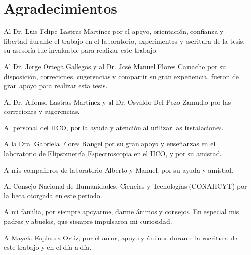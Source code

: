\chapter{Agradecimientos}
\label{chap:acknowledgments}

Al Dr. Luis Felipe Lastras Martínez por el apoyo, orientación, confianza y libertad durante el trabajo en el laboratorio, experimentos y escritura de la tesis, su asesoría fue invaluable para realizar este trabajo.

Al Dr. Jorge Ortega Gallegos y al Dr. José Manuel Flores Camacho por su disposición, correciones, sugerencias y compartir su gran experiencia, fueron de gran apoyo para realizar esta tesis.

Al Dr. Alfonso Lastras Martínez y al Dr. Osvaldo Del Pozo Zamudio por las correciones y sugerencias.

Al personal del IICO, por la ayuda y atención al utilizar las instalaciones.

A la Dra. Gabriela Flores Rangel por su gran apoyo y enseñanzas en el laboratorio de Elipsometría Espectroscopia en el IICO, y por su amistad. 

A mis compañeros de laboratorio Alberto y Manuel, por su ayuda y amistad.

Al Consejo Nacional de Humanidades, Ciencias y Tecnologías (CONAHCYT) por la beca otorgada en este periodo.

A mi familia, por siempre apoyarme, darme ánimos y consejos. En especial mis padres y abuelos, que siempre impulsaron mi curiosidad.

A Mayela Espinosa Ortiz, por el amor, apoyo y ánimos durante la escritura de este trabajo y en el día a día.



